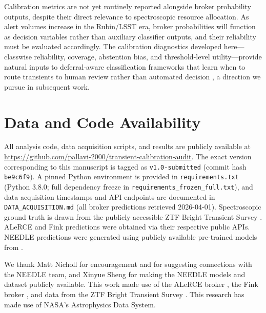 \documentclass[twocolumn]{aastex631}
\begin{document}
Calibration metrics are not yet routinely reported alongside
broker probability outputs, despite their direct relevance to
spectroscopic resource allocation. As alert volumes increase in
the Rubin/LSST era, broker probabilities will function as
decision variables rather than auxiliary classifier outputs, and
their reliability must be evaluated accordingly. The calibration
diagnostics developed here---classwise reliability, coverage,
abstention bias, and threshold-level utility---provide natural
inputs to deferral-aware classification frameworks that learn
when to route transients to human review rather than automated
decision \citep{madras2018, mozannar2020}, a direction we pursue
in subsequent work.


\section*{Data and Code Availability}

All analysis code, data acquisition scripts, and results are publicly
available at \url{https://github.com/pallavi-2000/transient-calibration-audit}.
The exact version corresponding to this manuscript is tagged as
\texttt{v1.0-submitted} (commit hash \texttt{be9c6f9}).
A pinned Python environment is provided in \texttt{requirements.txt}
(Python 3.8.0; full dependency freeze in
\texttt{requirements\_frozen\_full.txt}), and data acquisition timestamps
and API endpoints are documented in \texttt{DATA\_ACQUISITION.md}
(all broker predictions retrieved 2026-04-01).
Spectroscopic ground truth is drawn from the publicly accessible ZTF
Bright Transient Survey \citep{fremling2020, perley2020}. ALeRCE and
Fink predictions were obtained via their respective public APIs. NEEDLE
predictions were generated using publicly available pre-trained models
from \citet{sheng2024}.


\begin{acknowledgments}
We thank Matt Nicholl for encouragement and for suggesting connections with the NEEDLE team, and Xinyue Sheng for making the NEEDLE models and dataset publicly available. This work made use of the ALeRCE broker \citep{forster2021}, the Fink broker \citep{moller2021}, and data from the ZTF Bright Transient Survey \citep{fremling2020, perley2020}. This research has made use of NASA's Astrophysics Data System.
\end{acknowledgments}
\end{document}
